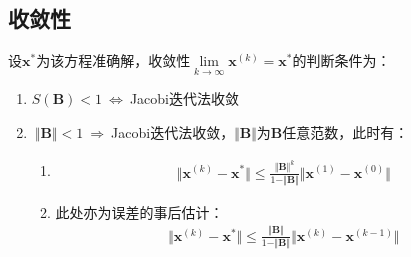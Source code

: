 \subsection{收敛性}
设$\boldsymbol{x}^\ast$为该方程准确解，收敛性$\lim\limits_{k\rightarrow\infty}\boldsymbol{x}^{(k)}=\boldsymbol{x}^{\ast}$的判断条件为：
\begin{enumerate}
    \item $S(\boldsymbol{B})<1\ \Leftrightarrow \ $Jacobi迭代法收敛
    \item $\ \Vert\boldsymbol{B}\Vert < 1 \ \Rightarrow \ $Jacobi迭代法收敛，$\Vert\boldsymbol{B}\Vert$为$\boldsymbol{B}$任意范数，此时有：
        \begin{enumerate}
            \item \begin{align}
                \Vert\boldsymbol{x}^{(k)} - \boldsymbol{x}^\ast\Vert \leqslant \frac{\Vert\boldsymbol{B}\Vert^k}{1-\Vert\boldsymbol{B}\Vert} \Vert\boldsymbol{x}^{(1)} - \boldsymbol{x}^{(0)}\Vert
            \end{align}
            \item 此处亦为误差的事后估计：\begin{align}
                \Vert\boldsymbol{x}^{(k)} - \boldsymbol{x}^\ast\Vert \leqslant \frac{\Vert\boldsymbol{B}\Vert}{1-\Vert\boldsymbol{B}\Vert} \Vert\boldsymbol{x}^{(k)} - \boldsymbol{x}^{(k-1)}\Vert
            \end{align}
        \end{enumerate}
\end{enumerate}

